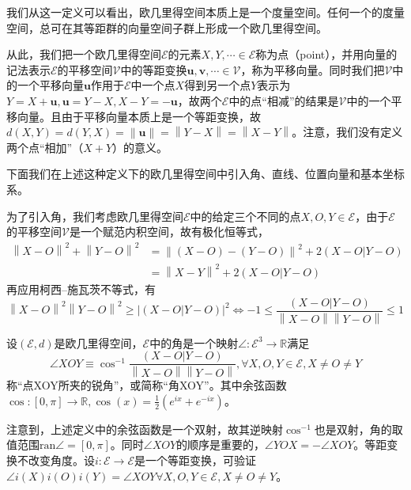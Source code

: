 \documentclass[main.tex]{subfiles}
\begin{document}
我们从这一定义可以看出，欧几里得空间本质上是一个度量空间。任何一个的度量空间，总可在其等距群的向量空间子群上形成一个欧几里得空间。

从此，我们把一个欧几里得空间$\mathcal{E}$的元素$X,Y,\cdots\in\mathcal{E}$称为点（point），并用向量的记法表示$\mathcal{E}$的平移空间$\mathcal{V}$中的等距变换$\mathbf{u},\mathbf{v},\cdots\in\mathcal{V}$，称为平移向量。同时我们把$\mathcal{V}$中的一个平移向量$\mathbf{u}$作用于$\mathcal{E}$中一个点$X$得到另一个点$Y$表示为$Y=X+\mathbf{u},\mathbf{u}=Y-X,X-Y=-\mathbf{u}$，故两个$\mathcal{E}$中的点“相减”的结果是$\mathcal{V}$中的一个平移向量。且由于平移向量本质上是一个等距变换，故$d\left(X,Y\right)=d\left(Y,X\right)=\left\|\mathbf{u}\right\|=\left\|Y-X\right\|=\left\|X-Y\right\|$。注意，我们没有定义两个点“相加”（$X+Y$）的意义。

下面我们在上述这种定义下的欧几里得空间中引入角、直线、位置向量和基本坐标系。

为了引入角，我们考虑欧几里得空间$\mathcal{E}$中的给定三个不同的点$X,O,Y\in\mathcal{E}$，由于$\mathcal{E}$的平移空间$\mathcal{V}$是一个赋范内积空间，故有极化恒等式，
\begin{align*}
\left\|X-O\right\|^2+\left\|Y-O\right\|^2&=\left\|\left(X-O\right)-\left(Y-O\right)\right\|^2+2\left(X-O|Y-O\right)\\
&=\left\|X-Y\right\|^2+2\left(X-O|Y-O\right)
\end{align*}
再应用柯西--施瓦茨不等式，有
\[\left\|X-O\right\|^2\left\|Y-O\right\|^2\geq\left|\left(X-O|Y-O\right)\right|^2\Leftrightarrow-1\leq\frac{\left(X-O|Y-O\right)}{\left\|X-O\right\|\left\|Y-O\right\|}\leq1\]

\begin{definition}[角]
设$\left(\mathcal{E},d\right)$是欧几里得空间，$\mathcal{E}$中的角是一个映射$\angle:\mathcal{E}^3\rightarrow\mathbb{R}$满足
\[\angle XOY\equiv\cos^{-1}\frac{\left(X-O|Y-O\right)}{\left\|X-O\right\|\left\|Y-O\right\|},\forall X,O,Y\in\mathcal{E},X\neq O\neq Y\]
称“点XOY所夹的锐角”，或简称“角XOY”。其中余弦函数$\cos:\left[0,\pi\right]\rightarrow\mathbb{R},\cos\left(x\right)=\frac{1}{2}\left(e^{ix}+e^{-ix}\right)$。
\end{definition}

注意到，上述定义中的余弦函数是一个双射，故其逆映射$\cos^{-1}$也是双射，角的取值范围$\mathrm{ran}\angle=\left[0,\pi\right]$。同时$\angle XOY$的顺序是重要的，$\angle YOX=-\angle XOY$。等距变换不改变角度。设$i:\mathcal{E}\rightarrow\mathcal{E}$是一个等距变换，可验证$\angle i\left(X\right)i\left(O\right)i\left(Y\right)=\angle XOY\forall X,O,Y\in\mathcal{E},X\neq O\neq Y$。
\end{document}
